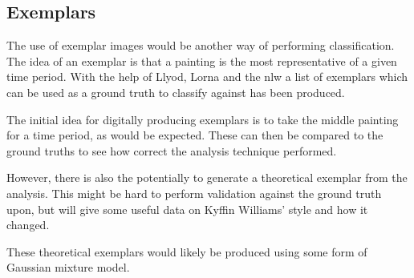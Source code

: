 
\subsection{Exemplars}
The use of exemplar images would be another way of performing classification. The idea of an 
exemplar is that a painting is the most representative of a given time period. With the help of
Llyod, Lorna and the \gls{nlw} a list of exemplars which can be used as a ground truth to classify
against has been produced.

The initial idea for digitally producing exemplars is to take the middle painting for a time 
period, as would be expected. These can then be compared to the ground truths to see how correct
the analysis technique performed.

However, there is also the potentially to generate a theoretical exemplar from the analysis. This
might be hard to perform validation against the ground truth upon, but will give some useful data
on Kyffin Williams' style and how it changed.

These theoretical exemplars would likely be produced using some form of Gaussian mixture model.

